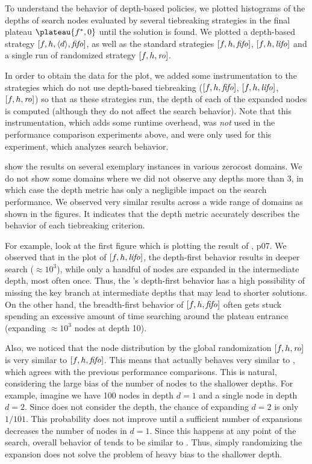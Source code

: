 To understand the behavior of depth-based policies, we plotted 
histograms of the depths of search nodes evaluated by several tiebreaking
strategies in the final plateau $\plateau{f^*,0}$ until the solution is
found.  We plotted a depth-based strategy
$[f,h,{\left<d\right>},{\text{\textit{fifo}}}]$, as well as the standard strategies $[f,h,{\text{\textit{fifo}}}]$,
$[f,h,{\text{\textit{lifo}}}]$ and a single run of randomized strategy $[f,h,{\text{\textit{ro}}}]$.

In order to obtain the data for the plot, we added some instrumentation to the strategies which do not use depth-based tiebreaking ($[f,h,{\text{\textit{fifo}}}]$, $[f,h,{\text{\textit{lifo}}}]$, $[f,h,{\text{\textit{ro}}}]$) so that as these strategies run, the depth of each of the expanded nodes is computed (although they do not affect the search behavior).
Note that this instrumentation, which adds some runtime overhead, was \emph{not}
used in the performance comparison experiments above, and were only used for this experiment, which analyzes search behavior.


 show the results on several exemplary instances in
various zerocost domains.  We do not show some domains where we did not observe any depths more than 3, in which case
the depth metric has only a negligible impact on the search performance.
We observed very similar results across a wide range of domains as shown in the figures.
It indicates that the depth metric accurately describes the behavior of each tiebreaking criterion.

For example, look at the first figure which is plotting the result of , p07.
% 
We observed that in the plot of $[f,h,{\text{\textit{lifo}}}]$, the depth-first behavior results in deeper search ($\approx 10^3$), while
only a handful of nodes are expanded in the intermediate depth, most often once. Thus, the \lifo's depth-first
behavior has a high possibility of missing the key branch at intermediate depths that may lead to shorter solutions.
On the other hand, the breadth-first behavior of $[f,h,{\text{\textit{fifo}}}]$ often gets stuck spending an excessive amount of
time searching around the plateau entrance (expanding $\approx 10^3$ nodes at depth 10).

Also, we noticed that the node distribution by the global randomization $[f,h,{\text{\textit{ro}}}]$ is very similar to $[f,h,{\text{\textit{fifo}}}]$.
This means that \ro actually behaves very similar to \fifo, which agrees with the previous performance comparisons.
This is natural, considering the large bias of the number of nodes to the shallower depths.
For example, imagine we have 100 nodes in depth $d=1$ and a single node in depth $d=2$.
Since \ro does not consider the depth, the chance of expanding $d=2$ is only $1/101$.
This probability does not improve until a sufficient number of expansions decreases the number of nodes in $d=1$.
Since this happens at any point of the search, overall behavior of \ro tends to be similar to \fifo.
Thus, simply randomizing the expansion does not solve the problem of heavy bias to the shallower depth.

